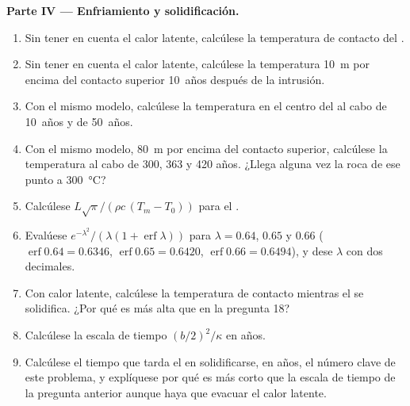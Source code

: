 \begin{problem}
\noindent\textbf{Parte IV --- Enfriamiento y solidificación.}
\begin{enumerate}[resume]
\item Sin tener en cuenta el calor latente, calcúlese la temperatura de contacto del .
\item Sin tener en cuenta el calor latente, calcúlese la temperatura \qty{10}{m} por encima del contacto
superior \num{10}~años después de la intrusión.
\item Con el mismo modelo, calcúlese la temperatura en el centro del  al cabo de
\num{10}~años y de \num{50}~años.
\item Con el mismo modelo, \qty{80}{m} por encima del contacto superior, calcúlese la temperatura al cabo de
\num{300}, \num{363} y \num{420} años. ¿Llega alguna vez la roca de ese punto a
\qty{300}{\celsius}?
\item Calcúlese $L\sqrt\pi/(\rho c\,(T_m - T_0))$ para el .
\item Evalúese $e^{-\lambda^2}/(\lambda(1 + \operatorname{erf}\lambda))$ para $\lambda = 0.64$,
$0.65$ y $0.66$ ($\operatorname{erf}0.64 = 0.6346$, $\operatorname{erf}0.65 = 0.6420$,
$\operatorname{erf}0.66 = 0.6494$), y dese $\lambda$ con dos decimales.
\item Con calor latente, calcúlese la temperatura de contacto mientras el 
se solidifica. ¿Por qué es más alta que en la pregunta 18?
\item Calcúlese la escala de tiempo $(b/2)^2/\kappa$ en años.
\item Calcúlese el tiempo que tarda el  en solidificarse, en años, el número clave de
este problema, y explíquese por qué es más corto que la escala de tiempo de la
pregunta anterior aunque haya que evacuar el calor latente.
\end{enumerate}
\end{problem}
